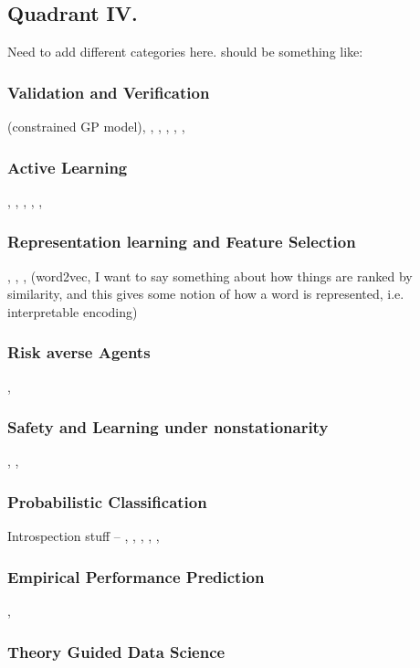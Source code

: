\subsection{Quadrant IV.}
Need to add different categories here. should be something like:
\subsubsection{Validation and Verification} \cite{Da_Veiga2012-gh} (constrained GP model), \cite{Da_Silva2016-qb}, \cite{Nishi2016-zq}, \cite{Hadfield-Menell2016-ws}, \cite{Weng_Wong2014-tj}, \cite{Conner2007-uw}, 
\subsubsection{Active Learning} \cite{Paul2011-vr}, \cite{Holub2008-pe}, \cite{Joshi2009-ws}, \cite{Kapoor2010-cy}, \cite{Triebel2013-ow}, \cite{MacKay1992-sp}
\subsubsection{Representation learning and Feature Selection} \cite{Bengio2013-uv}, \cite{Guyon2003-fj}, \cite{Haury2011-zi}, \cite{Mikolov2013-lt}(word2vec, I want to say something about how things are ranked by similarity, and this gives some notion of how a word is represented, i.e. interpretable encoding)
\subsubsection{Risk averse Agents} \cite{Curran2016-ij},  \cite{Lipton2016-dq}
\subsubsection{Safety and Learning under nonstationarity} \cite{Sugiyama2013-ci}, \cite{Garcia2015-rs},\cite{Quinonero-Candela2009-fj}
\subsubsection{Probabilistic Classification}
Introspection stuff -- \cite{Grimmett2013-gj}, \cite{Triebel2013-ku}, \cite{Triebel2016-kj}, \cite{Berczi2015-rd}, \cite{Grimmett2016-yc}, \cite{Dequaire2016-kh}
\subsubsection{Empirical Performance Prediction} \cite{Hutter2006-ak}, \cite{Leyton-Brown2009-yr}
\subsubsection{Theory Guided Data Science} \cite{Faghmous2014-og}

